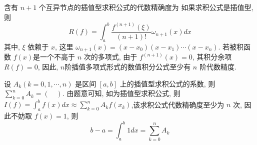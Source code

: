 \begin{tcolorbox}[enhanced,colback=10,colframe=9,breakable,coltitle=green!25!black,title=2024]
含有 $ n+1 $ 个互异节点的插值型求积公式的代数精确度为
\tcblower
 如果求积公式是插值型, 则
$$
R(f)=\int_{a}^{b} \frac{f^{(n+1)}(\xi)}{(n+1)!} \omega_{n+1}(x) d x
$$
其中, $ \xi $ 依赖于 $ x $, 这里 $ \omega_{n+1}(x)=\left(x-x_{0}\right)\left(x-x_{1}\right) \cdots\left(x-x_{n}\right) $. 若被积函数 $ f(x) $是一个不高于 $ n $ 次的多项式, 由于 $ f^{(n+1)}(x)=0 $, 其积分余项 $ R(f)=0 $, 因此, $ n $阶插值多项式形式的数值积分公式至少有 $ n $ 阶代数精度.
\end{tcolorbox}

 
\begin{tcolorbox}[enhanced,colback=10,colframe=9,breakable,coltitle=green!25!black,title=2024]
设 $ A_{k}(k=0,1, \cdots, n) $ 是区间 $ [a, b] $ 上的插值型求积公式的系数, 则 $ \sum\limits_{k=0}^{n} A_{k}=(\quad) $.
\tcblower
 由题意可知, 如为插值型求积公式, 则 $ I(f)=\int_{a}^{b} f(x) d x \approx \sum\limits_{k=0}^{n} A_{k} f\left(x_{k}\right) $,该求积公式代数精确度至少为 $ n $ 次, 因此不妨取 $ f(x)=1 $, 则
$$
b-a=\int_{a}^{b} 1 d x=\sum_{k=0}^{n} A_{k}
$$
\end{tcolorbox}
  

